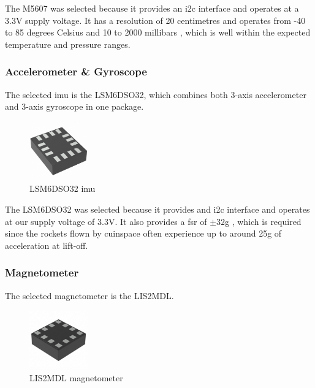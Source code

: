 The M5607 was selected because it provides an \gls{i2c} interface and operates at a 3.3V supply voltage.
\cite[1]{ms5607-datasheet} It has a resolution of 20 centimetres \cite[1]{ms5607-datasheet} and operates from -40 to 85
degrees Celsius and 10 to 2000 millibars \cite[1]{ms5607-datasheet}, which is well within the expected temperature and
pressure ranges.

\subsubsection{Accelerometer \& Gyroscope}

The selected \gls{imu} is the LSM6DSO32, which combines both 3-axis accelerometer and 3-axis gyroscope in one package.

\begin{figure}[H]
    \centering
    \includegraphics[width=1in]{assets/images/lsm6dso32.jpg}
    \caption{LSM6DSO32 \gls{imu} \cite{lsm6dso32-pic}}
\end{figure}

The LSM6DSO32 was selected because it provides and \gls{i2c} interface and operates at our supply voltage of 3.3V.
\cite{lsm6dso32-datasheet} It also provides a \gls{fsr} of $\pm 32$g \cite[1]{lsm6dso32-datasheet}, which is required
since the rockets flown by \gls{cuinspace} often experience up to around 25g of acceleration at lift-off.

\subsubsection{Magnetometer}

The selected magnetometer is the LIS2MDL.

\begin{figure}[H]
    \centering
    \includegraphics[width=1in]{assets/images/lis2mdl.jpg}
    \caption{LIS2MDL magnetometer \cite{lis2dml-pic}}
\end{figure}

